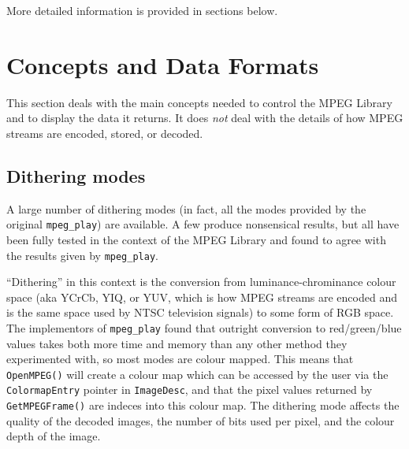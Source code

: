 \documentclass[11pt]{article}
\newcommand{\code}[1]{\texttt{#1}}
\begin{document}
More detailed information is provided in sections below.

\section{Concepts and Data Formats}

This section deals with the main concepts needed to control the MPEG
Library and to display the data it returns.  It does {\em not\/} deal
with the details of how MPEG streams are encoded, stored, or decoded.

\subsection{Dithering modes}
\label{sec:dithering}

A large number of dithering modes (in fact, all the modes provided by
the original \code{mpeg\_play}) are available.  A few produce
nonsensical results, but all have been fully tested in the context of
the MPEG Library and found to agree with the results given by
\code{mpeg\_play}.

``Dithering'' in this context is the conversion from
luminance-chrominance colour space (aka YCrCb, YIQ, or YUV, which is how
MPEG streams are encoded and is the same space used by NTSC television
signals) to some form of RGB space.  The implementors of
\code{mpeg\_play} found that outright conversion to red/green/blue
values takes both more time and memory than any other method they
experimented with, so most modes are colour mapped.  This means that
\code{OpenMPEG()} will create a colour map which can be accessed by the
user via the \code{ColormapEntry} pointer in \code{ImageDesc}, and that
the pixel values returned by \code{GetMPEGFrame()} are indeces into this
colour map.  The dithering mode affects the quality of the decoded
images, the number of bits used per pixel, and the colour depth of the
image.
\end{document}
